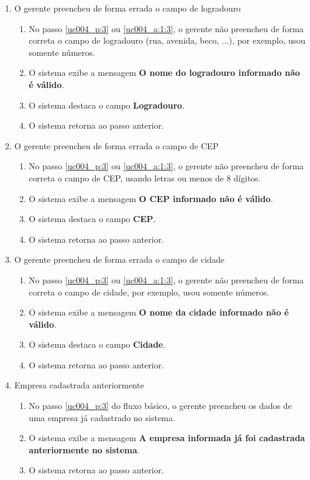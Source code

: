 \begin{enumerate}[label=E\arabic*]
	\item O gerente preencheu de forma errada o campo de logradouro \label{uc004_e:5}
	\begin{enumerate}[label*=.\arabic*]		
		\item[] No passo \ref{uc004_p:3} ou \ref{uc004_a:1:3}, o gerente não preencheu de forma correta o campo de logradouro (rua, avenida, beco, ...), por exemplo, usou somente números.		
		\item O sistema exibe a mensagem \textbf{O nome do logradouro informado não é válido}.
		\item O sistema destaca o campo \textbf{Logradouro}.
		\item O sistema retorna ao passo anterior.
	\end{enumerate}
	
	\item O gerente preencheu de forma errada o campo de CEP \label{uc004_e:6}
	\begin{enumerate}[label*=.\arabic*]		
		\item[] No passo \ref{uc004_p:3} ou \ref{uc004_a:1:3}, o gerente não preencheu de forma correta o campo de CEP, usando letras ou menos de 8 dígitos.		
		\item O sistema exibe a mensagem \textbf{O CEP informado não é válido}.
		\item O sistema destaca o campo \textbf{CEP}.
		\item O sistema retorna ao passo anterior.
	\end{enumerate}
	
	\item O gerente preencheu de forma errada o campo de cidade \label{uc004_e:7}
	\begin{enumerate}[label*=.\arabic*]		
		\item[] No passo \ref{uc004_p:3} ou \ref{uc004_a:1:3}, o gerente não preencheu de forma correta o campo de cidade, por exemplo, usou somente números.		
		\item O sistema exibe a mensagem \textbf{O nome da cidade informado não é válido}.
		\item O sistema destaca o campo \textbf{Cidade}.
		\item O sistema retorna ao passo anterior.
	\end{enumerate}	
	
	\item Empresa cadastrada anteriormente \label{uc004_e:8}
	\begin{enumerate}[label*=.\arabic*]
		\item[] No passo \ref{uc004_p:3} do fluxo básico, o gerente preencheu os dados de uma empresa já cadastrado no sistema.
		\item O sistema exibe a mensagem \textbf{A empresa informada já foi cadastrada anteriormente no sistema}.
		\item O sistema retorna ao passo anterior.
	\end{enumerate}
\end{enumerate}

